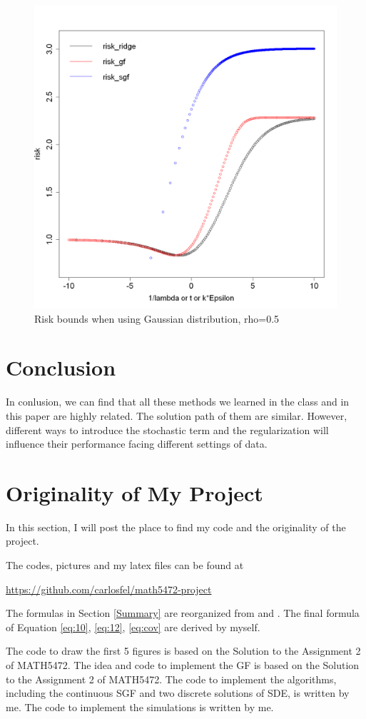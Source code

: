\documentclass[11pt]{article}
\begin{document}
\begin{figure}[H]
\centering
\includegraphics[width=0.9\linewidth]{fig9.png}
\caption{Risk bounds when using Gaussian distribution, rho=0.5}
\label{fig:rou0.5}
\end{figure}

\newpage

\section{Conclusion}

In conlusion, we can find that all these methods we learned in the class and in this paper are highly related. The solution path of them are similar. However, different ways to introduce the stochastic term and the regularization will influence their performance facing different settings of data.

\section{Originality of My Project}
	
In this section, I will post the place to find my code and the originality of the project.

The codes, pictures and my latex files can be found at 

\href{https://github.com/carlosfel/math5472-project}{https://github.com/carlosfel/math5472-project}

The formulas in Section \ref{Summary} are reorganized from \cite{ali2020implicit} and \cite{ali2019continuous}. The final formula of Equation \ref{eq:10}, \ref{eq:12}, \ref{eq:cov} are derived by myself. 

The code to draw the first 5 figures is based on the Solution to the Assignment 2 of MATH5472. The idea and code to implement the GF is based on the Solution to the Assignment 2 of MATH5472. The code to implement the algorithms, including the continuous SGF and two discrete solutions of SDE, is written by me. The code to implement the simulations is written by me.



\end{document}
